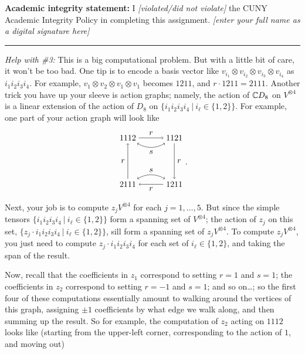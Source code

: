 \documentclass[11pt, reqno]{amsart}
\theoremstyle{plain}
\theoremstyle{definition}
\theoremstyle{example}
\newcommand\TikZ[1]{\begin{matrix}\begin{tikzpicture}#1\end{tikzpicture}\end{matrix}}
\begin{document}
\smallskip

\textbf{Academic integrity statement:} I \emph{[violated/did not violate]} the CUNY Academic Integrity Policy in completing this assignment. \hfill \emph{[enter your full name as a digital signature here]}

\medskip
\hrule

\vfill

\pagebreak

\emph{Help with \#3:} This is a big computational problem. But with a little bit of care, it won't be too bad. One tip is to encode a basis vector like $v_{i_1} \otimes v_{i_2} \otimes v_{i_3} \otimes v_{i_4}$ as $i_1i_2i_3i_4$. For example, $v_1 \otimes v_2 \otimes v_1\otimes v_1$ becomes $1211$, and $r \cdot 1211 = 2111$. Another trick you have up your sleeve is action graphs; namely, the action of $\mathbb{C} D_8$ on $V^{\otimes 4}$ is a linear extension of the action of $D_8$ on $\{i_1i_2i_3i_4 ~|~ i_\ell \in \{1,2\}\}$. For example, one part of your action graph will look like 
$$\TikZ{
	\node (1112) at (0,2) {1112}; 
	\node (1121) at (2,2) {1121}; 
	\node (1211) at (2,0) {1211}; 
	\node (2111) at (0,0) {2111}; 
	\draw[->] (1112) to node[above]{$r$} (1121);
	\draw[->] (1121) to node[right]{$r$} (1211);
	\draw[->] (1211) to node[below]{$r$} (2111);
	\draw[->] (2111) to node[left]{$r$} (1112);
	\draw[<->, bend right] (1112) to node[below]{$s$} (1121);
	\draw[<->, bend left] (2111) to node[above]{$s$} (1211);
}.$$
Next, your job is to compute $z_j V^{\otimes 4}$ for each $j = 1, \dots, 5$. But since the simple tensors $\{i_1i_2i_3i_4 ~|~ i_\ell \in \{1,2\}\}$ form a spanning set of $V^{\otimes 4}$; the action of $z_j$ on this set, $\{z_j \cdot i_1i_2i_3i_4 ~|~ i_\ell \in \{1,2\}\}$, sill form a spanning set of  $z_j V^{\otimes 4}$. To compute $z_j V^{\otimes 4}$, you just need to compute $z_j \cdot i_1i_2i_3i_4$ for each set of $i_\ell \in \{1,2\}$, and taking the span of the result. 


Now, recall that the coefficients in $z_1$ correspond to setting $r=1$ and $s=1$; the coefficients in $z_2$ correspond to setting $r=-1$ and $s=1$;  and so on\dots; so the first four of these computations essentially amount to walking around the vertices of this graph, assigning $\pm 1$ coefficients by what edge we walk along, and then summing up the result. So for example, the computation of $z_2$ acting on $1112$ looks like (starting from the upper-left corner, corresponding to the action of $1$, and moving out)
\end{document}

